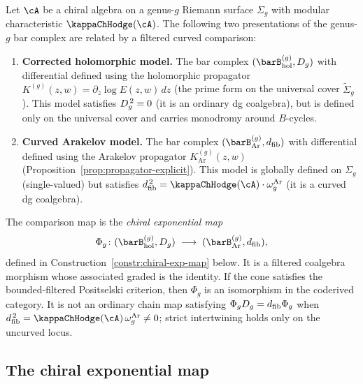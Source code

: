 \begin{theorem}
\label{thm:chiral-RH}
Let $\cA$ be a chiral algebra on a genus-$g$ Riemann surface
$\Sigma_g$ with modular characteristic $\kappaChHodge(\cA)$.
The following two presentations of the genus-$g$ bar complex are
related by a filtered curved comparison:
\begin{enumerate}[label=\textup{(\roman*)}]
\item \textbf{Corrected holomorphic model.}
 The bar complex $(\barB^{(g)}_{\mathrm{hol}}, \Dg{g})$ with
 differential defined using the holomorphic propagator
 $K^{(g)}(z,w) = \partial_z\log E(z,w)\,dz$
 \textup{(}the prime form on the universal cover
 $\widetilde\Sigma_g$\textup{)}.
 This model satisfies $D_{g}^{\,2} = 0$ (it is an ordinary
 dg coalgebra), but is defined only on the universal cover
 and carries monodromy around $B$-cycles.

\item \textbf{Curved Arakelov model.}
 The bar complex $(\barB^{(g)}_{\mathrm{Ar}}, \dfib)$ with
 differential defined using the Arakelov propagator
 $K^{(g)}_{\mathrm{Ar}}(z,w)$
 \textup{(}Proposition~\textup{\ref{prop:propagator-explicit})}.
 This model is globally defined on $\Sigma_g$
 \textup{(}single-valued\textup{)} but satisfies
 $\dfib^{\,2} = \kappaChHodge(\cA) \cdot \omega_g^{\mathrm{Ar}}$ (it is a curved dg
 coalgebra).
\end{enumerate}
The comparison map is the \emph{chiral exponential map}
\begin{equation}\label{eq:chiral-exp-map}
 \Phi_g\colon
 (\barB^{(g)}_{\mathrm{hol}}, \Dg{g})
 \;\longrightarrow\;
 (\barB^{(g)}_{\mathrm{Ar}}, \dfib),
\end{equation}
defined in
Construction~\textup{\ref{constr:chiral-exp-map}} below. It is a
filtered coalgebra morphism whose associated graded is the identity.
If the cone satisfies the bounded-filtered Positselski criterion,
then $\Phi_g$ is an isomorphism in the coderived category. It is
not an ordinary chain map satisfying
$\Phi_gD_{g}=d_{\mathrm{fib}}\Phi_g$ when
$\dfib^{\,2}=\kappaChHodge(\cA)\,\omega_g^{\mathrm{Ar}}\ne0$; strict intertwining holds only
on the uncurved locus.
\end{theorem}

\subsection{The chiral exponential map}
\label{subsec:chiral-exp-map}

